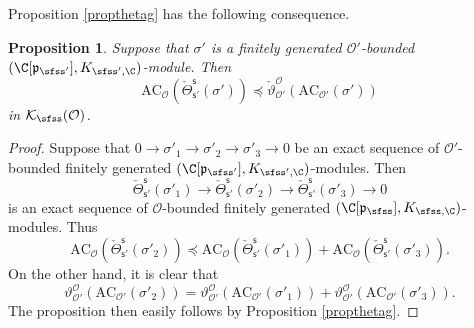 \documentclass[12pt,a4paper]{amsart}
\newcommand{\CK}{{\mathcal {K}}}
\newcommand{\CO}{{\mathcal {O}}}
\newcommand{\p}{\mathfrak p}
\numberwithin{equation}{section}
\newtheorem{prop}[thm]{Proposition}
\theoremstyle{remark}
\begin{document}
Proposition \ref{propthetag} has the following consequence. 
\begin{prop}\label{propthetag2}
Suppose that $\sigma'$ is a finitely generated $\CO'$-bounded $(\C[\p_{\sfss'}], K_{\sfss', \C})$-module. Then
\[
\mathrm{AC}_{\CO}( \check \Theta_{\mathsf s'}^{\mathsf s}(\sigma'))\preceq  \check \vartheta_{\CO'}^{\CO}(\mathrm{AC}_{\CO'}(\sigma'))
\]
in $\CK_\sfss(\CO)$. 

\end{prop}
\begin{proof}
Suppose that  $0\rightarrow \sigma'_1\rightarrow \sigma'_2\rightarrow \sigma'_3\rightarrow 0$ be an exact sequence of  $\CO'$-bounded finitely generated $(\C[\p_{\sfss'}], K_{\sfss', \C})$-modules. Then
\[
 \check \Theta_{\mathsf s'}^{\mathsf s}(\sigma'_1)\rightarrow \check \Theta_{\mathsf s'}^{\mathsf s}(\sigma'_2)\rightarrow \check \Theta_{\mathsf s'}^{\mathsf s}(\sigma'_3)\rightarrow 0
 \]
 is  an exact sequence of  $\CO$-bounded finitely generated $(\C[\p_{\sfss}], K_{\sfss, \C})$-modules. 
Thus
 \[
   \mathrm{AC}_{\CO}( \check \Theta_{\mathsf s'}^{\mathsf s}(\sigma'_2))\preceq \mathrm{AC}_{\CO}( \check \Theta_{\mathsf s'}^{\mathsf s}(\sigma'_1))+\mathrm{AC}_{\CO}( \check \Theta_{\mathsf s'}^{\mathsf s}(\sigma'_3)). 
 \]
 On the other hand, it is clear that
  \[
  \vartheta_{\CO'}^{\CO}(\mathrm{AC}_{\CO'}(\sigma'_2))= \vartheta_{\CO'}^{\CO}(\mathrm{AC}_{\CO'}(\sigma'_1))+ \vartheta_{\CO'}^{\CO}(\mathrm{AC}_{\CO'}(\sigma'_3)).
  \]
The proposition then easily follows by Proposition \ref{propthetag}. 
\end{proof}
\end{document}
